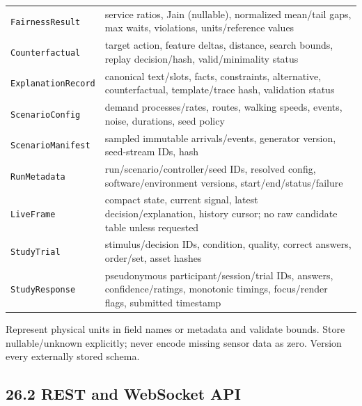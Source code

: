\documentclass[
  english,
  11pt,
  a4paper,
]{article}
\begin{document}
{\begin{longtable}[]{@{}
  >{\raggedright\arraybackslash}p{}
  >{\raggedright\arraybackslash}p{}@{}}
\texttt{FairnessResult} & service ratios, Jain (nullable), normalized
mean/tail gaps, max waits, violations, units/reference values \\
\texttt{Counterfactual} & target action, feature deltas, distance,
search bounds, replay decision/hash, valid/minimality status \\
\texttt{ExplanationRecord} & canonical text/slots, facts, constraints,
alternative, counterfactual, template/trace hash, validation status \\
\texttt{ScenarioConfig} & demand processes/rates, routes, walking
speeds, events, noise, durations, seed policy \\
\texttt{ScenarioManifest} & sampled immutable arrivals/events, generator
version, seed-stream IDs, hash \\
\texttt{RunMetadata} & run/scenario/controller/seed IDs, resolved
config, software/environment versions, start/end/status/failure \\
\texttt{LiveFrame} & compact state, current signal, latest
decision/explanation, history cursor; no raw candidate table unless
requested \\
\texttt{StudyTrial} & stimulus/decision IDs, condition, quality, correct
answers, order/set, asset hashes \\
\texttt{StudyResponse} & pseudonymous participant/session/trial IDs,
answers, confidence/ratings, monotonic timings, focus/render flags,
submitted timestamp \\
\end{longtable}
}

Represent physical units in field names or metadata and validate bounds.
Store nullable/unknown explicitly; never encode missing sensor data as
zero. Version every externally stored schema.

\subsection{26.2 REST and WebSocket API}\label{rest-and-websocket-api}
\end{document}
